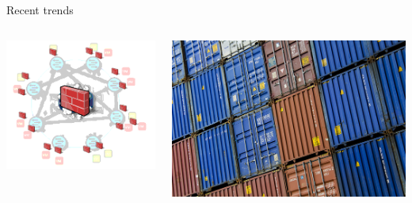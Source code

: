 \documentclass[black,white]{beamer}
\newcommand\blfootnote[1]{%
  \begingroup
  \renewcommand\thefootnote{}\footnote{#1}%
  \addtocounter{footnote}{-1}%
  \endgroup
}
\begin{document}
    \begin{frame}{Recent trends}
        \begin{columns}[c]
            \begin{column}{0.5\textwidth}
                \includegraphics[width=1.0\textwidth]{dfw.png}
            \end{column}
            \begin{column}{0.5\textwidth}
                \includegraphics[width=1.0\textwidth]{containers.jpg}
            \end{column}
        \end{columns}
    \end{frame}
\end{document}
